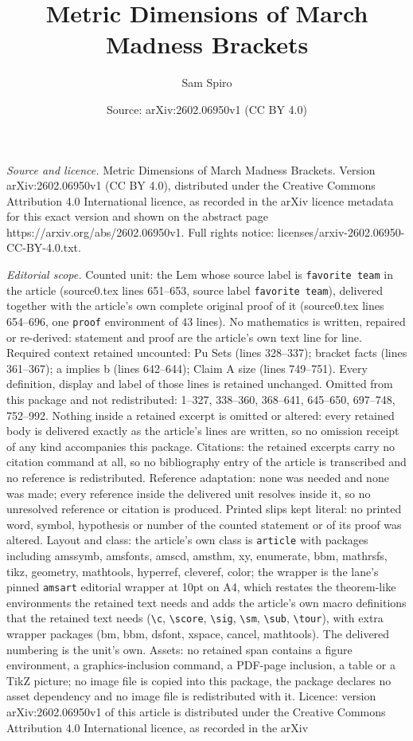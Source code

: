 \documentclass[10pt,a4paper]{amsart}
\title[Metric Dimensions of March Madness Brackets]{Metric Dimensions of March Madness Brackets}
\author{Sam Spiro}
\date{Source: arXiv:2602.06950v1 (CC BY 4.0)}
\begin{document}
\maketitle

\noindent\emph{Source and licence.} Metric Dimensions of March Madness Brackets. Version arXiv:2602.06950v1 (CC BY 4.0), distributed under the Creative Commons Attribution 4.0 International licence, as recorded in the arXiv licence metadata for this exact version and shown on the abstract page https://arxiv.org/abs/2602.06950v1. Full rights notice: licenses/arxiv-2602.06950-CC-BY-4.0.txt.\par\smallskip

\noindent\textit{Editorial scope.} Counted unit: the Lem whose source label is \texttt{favorite team} in the article (source0.tex lines 651--653, source label \texttt{favorite team}), delivered together with the article's own complete original proof of it (source0.tex lines 654--696, one \texttt{proof} environment of 43 lines). No mathematics is written, repaired or re-derived: statement and proof are the article's own text line for line. Required context retained uncounted: Pu Sets (lines 328--337); bracket facts (lines 361--367); a implies b (lines 642--644); Claim A size (lines 749--751). Every definition, display and label of those lines is retained unchanged. Omitted from this package and not redistributed: 1--327, 338--360, 368--641, 645--650, 697--748, 752--992. Nothing inside a retained excerpt is omitted or altered: every retained body is delivered exactly as the article's lines are written, so no omission receipt of any kind accompanies this package. Citations: the retained excerpts carry no citation command at all, so no bibliography entry of the article is transcribed and no reference is redistributed. Reference adaptation: none was needed and none was made; every reference inside the delivered unit resolves inside it, so no unresolved reference or citation is produced. Printed slips kept literal: no printed word, symbol, hypothesis or number of the counted statement or of its proof was altered. Layout and class: the article's own class is \texttt{article} with packages including amssymb, amsfonts, amscd, amsthm, xy, enumerate, bbm, mathrsfs, tikz, geometry, mathtools, hyperref, cleveref, color; the wrapper is the lane's pinned \texttt{amsart} editorial wrapper at 10pt on A4, which restates the theorem-like environments the retained text needs and adds the article's own macro definitions that the retained text needs (\texttt{\textbackslash c}, \texttt{\textbackslash score}, \texttt{\textbackslash sig}, \texttt{\textbackslash sm}, \texttt{\textbackslash sub}, \texttt{\textbackslash tour}), with extra wrapper packages (bm, bbm, dsfont, xspace, cancel, mathtools). The delivered numbering is the unit's own. Assets: no retained span contains a figure environment, a graphics-inclusion command, a PDF-page inclusion, a table or a TikZ picture; no image file is copied into this package, the package declares no asset dependency and no image file is redistributed with it. Licence: version arXiv:2602.06950v1 of this article is distributed under the Creative Commons Attribution 4.0 International licence, as recorded in the arXiv 
\end{document}

